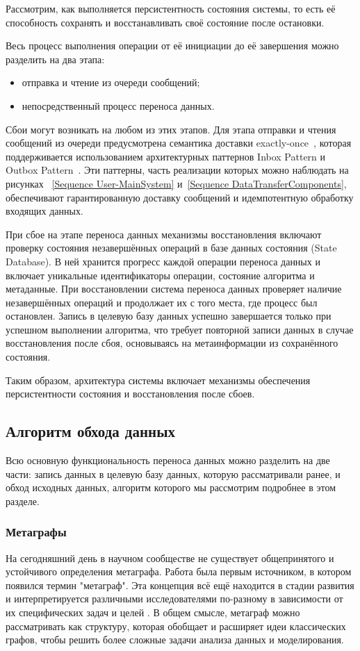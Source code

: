 Рассмотрим, как выполняется персистентность состояния системы, то есть её способность сохранять и восстанавливать своё состояние после остановки.

Весь процесс выполнения операции от её инициации до её завершения можно разделить на два этапа:
\begin{itemize}
  \item отправка и чтение из очереди сообщений;
  \item непосредственный процесс переноса данных.
\end{itemize}

Сбои могут возникать на любом из этих этапов. Для этапа отправки и чтения сообщений из очереди предусмотрена семантика доставки exactly-once~\cite{delivery-guarantees}, которая поддерживается использованием архитектурных паттернов Inbox Pattern и Outbox Pattern~\cite{outbox-and-inbox}. Эти паттерны, часть реализации которых можно наблюдать на рисунках ~\ref{Sequence User-MainSystem} и~\ref{Sequence DataTransferComponents}, обеспечивают гарантированную доставку сообщений и идемпотентную обработку входящих данных.

При сбое на этапе переноса данных механизмы восстановления включают проверку состояния незавершённых операций в базе данных состояния (State Database). В ней хранится прогресс каждой операции переноса данных и включает уникальные идентификаторы операции, состояние алгоритма и метаданные. При восстановлении система переноса данных проверяет наличие незавершённых операций и продолжает их с того места, где процесс был остановлен. Запись в целевую базу данных успешно завершается только при успешном выполнении алгоритма, что требует повторной записи данных в случае восстановления после сбоя, основываясь на метаинформации из сохранённого состояния.

Таким образом, архитектура системы включает механизмы обеспечения персистентности состояния и восстановления после сбоев.

\subsection{Алгоритм обхода данных}

Всю основную функциональность переноса данных можно разделить на две части: запись данных в целевую базу данных, которую рассматривали ранее, и обход исходных данных, алгоритм которого мы рассмотрим подробнее в этом разделе.

\subsubsection{Метаграфы}
На сегодняшний день в научном сообществе не существует общепринятого и устойчивого определения метаграфа. Работа \cite{metagraphs_1} была первым источником, в котором появился термин "метаграф". Эта концепция всё ещё находится в стадии развития и интерпретируется различными исследователями по-разному в зависимости от их специфических задач и целей \cite{metagraphs_2, metagraphs_3, metagraphs_4, metagraphs_5}. В общем смысле, метаграф можно рассматривать как структуру, которая обобщает и расширяет идеи классических графов, чтобы решить более сложные задачи анализа данных и моделирования.

